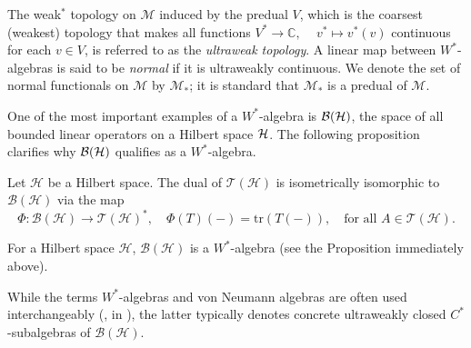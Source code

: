 \begin{definition}
  The weak\(^*\) topology on \(  \mathscr{M} \) induced by the predual $V$, which is the coarsest (weakest) topology  that makes all functions
\(
V^*\to \mathbb{C}, \,
\quad v^* \mapsto v^*(v)
\)
continuous for each \( v \in V \), is referred to as the \emph{ultraweak topology}. A linear map between \( W^* \)-algebras 
is said to be \emph{normal} if it is ultraweakly continuous.
We denote the set of normal functionals on \(  \mathscr{M} \) by \(  \mathscr{M}_* \); it is standard that \(  \mathscr{M}_* \) is a predual of \(  \mathscr{M} \).
\end{definition}

One of the most important examples of a $W^*$-algebra is $\mathcal{B}(\mathcal{H})$, the space of all bounded linear operators on a Hilbert space $\mathcal{H}$. The following proposition clarifies why \( \mathcal{B}(\mathcal{H}) \) qualifies as a \( W^* \)-algebra.

\begin{proposition} \cite[Theorem 19.2]{conwayCourseOperatorTheory2000}
  Let \(\mathcal{H}\) be a Hilbert space.
    The dual of \(\mathcal{T}(\mathcal{H})\) is isometrically isomorphic to \(\mathcal{B}(\mathcal{H})\) via the map
    \[
    \Phi : \mathcal{B}(\mathcal{H}) \to \mathcal{T}(\mathcal{H})^*, \quad \Phi(T)(-) = \mathrm{tr}(T(-)), \quad \text{for all } A \in \mathcal{T}(\mathcal{H}).
    \]
\end{proposition}

\begin{example}

  For a Hilbert space $\mathcal{H}$, $\mathcal{B}(\mathcal{H})$ is a $W^*$-algebra (see the Proposition immediately above).
\end{example}

\begin{remark}
  While the terms $W^*$-algebras and von Neumann algebras are often used interchangeably (\eg, in \cite{westerbaanCategoryNeumannAlgebras2019}), the latter typically denotes concrete ultraweakly closed $C^*$-subalgebras of $\mathcal{B}(\mathcal{H})$.
\end{remark}

